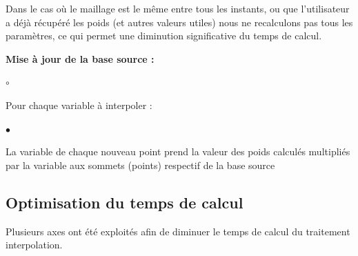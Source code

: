 \vspace{0.5cm}

\noindent Dans le cas où le maillage est le même entre tous les instants, ou que l'utilisateur a déjà récupéré les poids (et autres valeurs utiles) nous ne recalculons pas tous les paramètres, ce qui permet une diminution significative du temps de calcul.

\vspace{0.5cm}

\textbf{Mise à jour de la base source :}
\begin{list}{$\circ$}{\leftmargin=0.5cm  \itemsep=0cm}
    \item Pour chaque variable à interpoler :
    \begin{list}{$\bullet$}{\leftmargin=0.5cm  \itemsep=0cm}
        \item La variable de chaque nouveau point prend la valeur des poids calculés multipliés par la variable aux sommets (points) respectif de la base source
    \end{list}
\end{list}




\subsection{Optimisation du temps de calcul}

Plusieurs axes ont été exploités afin de diminuer le temps de calcul du traitement interpolation.

